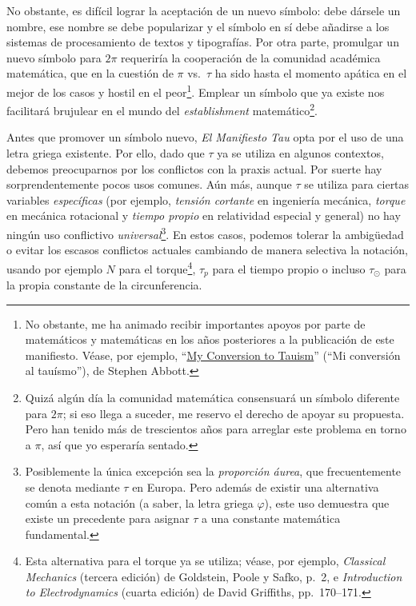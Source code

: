 No obstante, es difícil lograr la aceptación de un nuevo símbolo: debe dársele un nombre, ese nombre se debe popularizar y el símbolo en sí debe añadirse a los sistemas de procesamiento de textos y tipografías. Por otra parte, promulgar un nuevo símbolo para $2\pi$ requeriría la cooperación de la comunidad académica matemática, que en la cuestión de $\pi$ vs.\ $\tau$ ha sido hasta el momento apática en el mejor de los casos y hostil en el peor\footnote{No obstante, me ha animado recibir importantes apoyos por parte de matemáticos y matemáticas en los años posteriores a la publicación de este manifiesto. Véase, por ejemplo, ``\href{https://www.maa.org/sites/default/files/pdf/Mathhorizons/apr12_aftermath.pdf}{My Conversion to Tauism}'' (``Mi conversión al tauísmo''), de Stephen Abbott.}. Emplear un símbolo que ya existe nos facilitará brujulear en el mundo del \emph{establishment} matemático\footnote{Quizá algún día la comunidad matemática consensuará un símbolo diferente para $2\pi$; si eso llega a suceder, me reservo el derecho de apoyar su propuesta. Pero han tenido más de trescientos años para arreglar este problema en torno a $\pi$, así que yo esperaría sentado.}.

Antes que promover un símbolo nuevo, \emph{El Manifiesto Tau} opta por el uso de una letra griega existente. Por ello, dado que $\tau$ ya se utiliza en algunos contextos, debemos preocuparnos por los conflictos con la praxis actual. Por suerte hay sorprendentemente pocos usos comunes. Aún más, aunque $\tau$ se utiliza para ciertas variables \emph{específicas} (por ejemplo, \emph{tensión cortante} en ingeniería mecánica, \emph{torque} en mecánica rotacional y \emph{tiempo propio} en relatividad especial y general) no hay ningún uso conflictivo \emph{universal}\footnote{Posiblemente la única excepción sea la \emph{proporción áurea}, que frecuentemente se denota mediante $\tau$ en Europa. Pero además de existir una alternativa común a esta notación (a saber, la letra griega $\varphi$), este uso demuestra que existe un precedente para asignar $\tau$ a una constante matemática fundamental.}. En estos casos, podemos tolerar la ambigüedad o evitar los escasos conflictos actuales cambiando de manera selectiva la notación, usando por ejemplo $N$ para el torque\footnote{Esta alternativa para el torque ya se utiliza; véase, por ejemplo, \emph{Classical Mechanics} (tercera edición) de Goldstein, Poole y Safko, p.~2, e \emph{Introduction to Electrodynamics} (cuarta edición) de David Griffiths, pp.~170–171.}, $\tau_p$ para el tiempo propio o incluso $\tau_\odot$ para la propia constante de la circunferencia.

